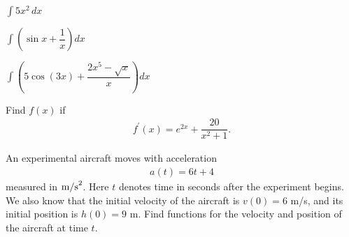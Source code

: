 \documentclass[addpoints, 12pt]{exam}
\begin{document}
\begin{questions}
\setcounter{question}{9}

\question
$\displaystyle \int 5x^2 \, dx$

\question
$\displaystyle \int \left( \sin x + \dfrac{1}{x} \right) dx$

\question
$\displaystyle \int \left( 5 \cos (3x) + \dfrac{2x^5 - \sqrt{x}}{x} \right) dx$

\clearpage

\question
Find $f(x)$ if
\begin{align*}
f^{\prime}(x) = e^{2x} + \dfrac{20}{x^2 + 1}.
\end{align*}

\question
An experimental aircraft moves with acceleration
\begin{align*}
	a(t) = 6t + 4
\end{align*}
measured in $\textnormal{m/s}^2$.  Here $t$ denotes time in seconds after the experiment begins.  We also know that the initial velocity
of the aircraft is $v(0) = 6$ m/s, and its initial position is \newline $h(0) = 9$ m.  Find functions for the velocity and position of the aircraft at time $t$.
\end{questions}
\end{document}
